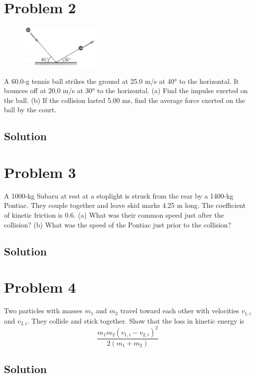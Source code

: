 \documentclass[12pt]{article}
\begin{document}
\pagebreak
\section*{Problem 2}
\begin{figure}
    \vspace{-30pt}
    \includegraphics[width=0.35\textwidth]{graph_2.png} 
\end{figure}
A 60.0-g tennis ball strikes the ground at 25.0 m/s at 40\unit{\degree} to the horizontal. It bounces off at 20.0 m/s at 30\unit{\degree} to the horizontal. (a) Find the impulse exerted on the ball. (b) If the collision lasted 5.00 ms, find the average force exerted on the ball by the court.

\subsection*{Solution}


\pagebreak
\section*{Problem 3}
A 1000-kg Subaru at rest at a stoplight is struck from the rear by a 1400-kg Pontiac. They couple together and leave skid marks 4.25 m long. The coefficient of kinetic friction is 0.6. (a) What was their common speed just after the collision? (b) What was the speed of the Pontiac just prior to the collision?

\subsection*{Solution}


\pagebreak
\section*{Problem 4}
Two particles with masses $m_1$ and $m_2$ travel toward each other with velocities $v_{1,i}$ and $v_{2,i}$. They collide and stick together. Show that the loss in kinetic energy is
\[ \frac{m_1 m_2 \left(v_{1,i} - v_{2,i}\right)^2}{2(m_1 + m_2)} \]

\subsection*{Solution}
\end{document}
